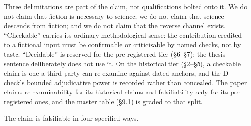 \documentclass[11pt,a4paper]{article}
\begin{document}
Three delimitations are part of the claim, not qualifications bolted onto it. We do not claim that fiction is necessary to science; we do not claim that science descends from fiction; and we do not claim that the reverse channel exists. ``Checkable'' carries its ordinary methodological sense: the contribution credited to a fictional input must be confirmable or criticizable by named checks, not by taste. ``Decidable'' is reserved for the pre-registered tier (§6–§7); the thesis sentence deliberately does not use it. On the historical tier (§2–§5), a checkable claim is one a third party can re-examine against dated anchors, and the D check's bounded adjudicative power is recorded rather than concealed. The paper claims re-examinability for its historical claims and falsifiability only for its pre-registered ones, and the master table (§9.1) is graded to that split.

The claim is falsifiable in four specified ways.
\end{document}
